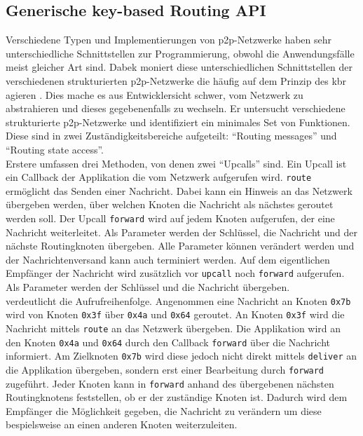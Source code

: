 \subsection{Generische key-based Routing API}
\label{chap:grundlagen:api}
Verschiedene Typen und Implementierungen von p2p-Netzwerke haben sehr unterschiedliche Schnittstellen zur Programmierung, obwohl die Anwendungsfälle meist gleicher Art sind. Dabek moniert diese unterschiedlichen Schnittstellen der verschiedenen strukturierten p2p-Netzwerke die häufig auf dem Prinzip des \ac{kbr} agieren \cite{Dabek2003Towards}. Dies mache es aus Entwicklersicht schwer, vom Netzwerk zu abstrahieren und dieses gegebenenfalls zu wechseln. Er untersucht verschiedene strukturierte p2p-Netzwerke und identifiziert ein minimales Set von Funktionen. Diese sind in zwei Zuständigkeitsbereiche aufgeteilt: \enquote{Routing messages} und \enquote{Routing state access}.\\
Erstere umfassen drei Methoden, von denen zwei \enquote{Upcalls} sind. Ein Upcall ist ein Callback der Applikation die vom Netzwerk aufgerufen wird. \texttt{route} ermöglicht das Senden einer Nachricht. Dabei kann ein Hinweis an das Netzwerk übergeben werden, über welchen Knoten die Nachricht als nächstes geroutet werden soll. Der Upcall \texttt{forward} wird auf jedem Knoten aufgerufen, der eine Nachricht weiterleitet. Als Parameter werden der Schlüssel, die Nachricht und der nächste Routingknoten übergeben. Alle Parameter können verändert werden und der Nachrichtenversand kann auch terminiert werden. Auf dem eigentlichen Empfänger der Nachricht wird zusätzlich vor \texttt{upcall} noch \texttt{forward} aufgerufen. Als Parameter werden der Schlüssel und die Nachricht übergeben.\\
 verdeutlicht die Aufrufreihenfolge. Angenommen eine Nachricht an Knoten \texttt{0x7b} wird von Knoten \texttt{0x3f} über \texttt{0x4a} und \texttt{0x64} geroutet. An Knoten \texttt{0x3f} wird die Nachricht mittels \texttt{route} an das Netzwerk übergeben. Die Applikation wird an den Knoten \texttt{0x4a} und \texttt{0x64} durch den Callback \texttt{forward} über die Nachricht informiert. Am Zielknoten \texttt{0x7b} wird diese jedoch nicht direkt mittels \texttt{deliver} an die Applikation übergeben, sondern erst einer Bearbeitung durch \texttt{forward} zugeführt. Jeder Knoten kann in \texttt{forward} anhand des übergebenen nächsten Routingknotens feststellen, ob er der zuständige Knoten ist. Dadurch wird dem Empfänger die Möglichkeit gegeben, die Nachricht zu verändern um diese bespielsweise an einen anderen Knoten weiterzuleiten.

